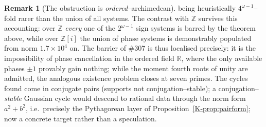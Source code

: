 \documentclass[11pt]{article}
\theoremstyle{definition}
\newtheorem{remark}[theorem]{Remark}
\begin{document}
\begin{remark}[The obstruction is \emph{ordered}--archimedean]
being heuristically $4^{\omega-1}$--fold rarer than the union of all systems. The contrast with
$\mathbb{Z}$ survives this accounting: over $\mathbb{Z}$ \emph{every} one of the $2^{\omega-1}$ sign
systems is barred by the theorem above, while over $\mathbb{Z}[i]$ the union of phase systems is
demonstrably populated from norm $1.7\times10^4$ on. The barrier of \#307 is thus localised precisely: it is the impossibility of phase
cancellation in the ordered field $\mathbb{R}$, where the only available phases $\pm1$ provably gain
nothing; while the moment fourth roots of unity are admitted, the analogous existence problem closes
at seven primes. The cycles found come in conjugate pairs (supports not conjugation--stable); a
conjugation--\emph{stable} Gaussian cycle would descend to rational data through the norm form
$a^2+b^2$, i.e.\ precisely the Pythagorean layer of Proposition~\ref{K-prop:pairform}; now a concrete
target rather than a speculation.
\end{remark}
\end{document}
